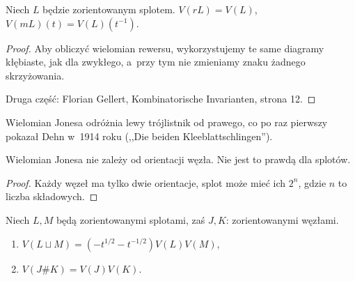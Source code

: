 \begin{proposition}
    Niech $L$ będzie zorientowanym splotem.
    $V(rL)=V(L)$, $V(mL)(t)=V(L)(t^{-1})$.
\end{proposition}

\begin{proof}
    Aby obliczyć wielomian rewersu, wykorzystujemy te same diagramy kłębiaste,
    jak dla zwykłego, a~przy tym nie zmieniamy znaku żadnego skrzyżowania.

    Druga część: Florian Gellert, Kombinatorische Invarianten, strona 12.
\end{proof}

Wielomian Jonesa odróżnia lewy trójlistnik od prawego, co po raz pierwszy pokazał Dehn w~1914 roku (,,Die beiden Kleeblattschlingen'').

\begin{corollary}
    Wielomian Jonesa nie zależy od orientacji węzła.
    Nie jest to prawdą dla splotów.
\end{corollary}

\begin{proof}
    Każdy węzeł ma tylko dwie orientacje, splot może mieć ich $2^n$, gdzie $n$ to liczba składowych.
\end{proof}

\begin{proposition}
    Niech $L, M$ będą zorientowanymi splotami, zaś $J, K$: zorientowanymi węzłami.
    \begin{enumerate}
        \item $V(L \sqcup M) = (-t^{1/2} - t^{-1/2}) V(L) V(M)$,
        \item $V(J \# K) = V(J) V(K)$.
    \end{enumerate}
\end{proposition}

